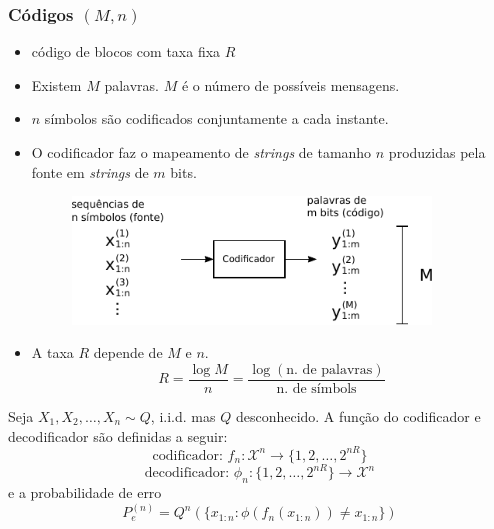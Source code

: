 \begin{frame}[allowframebreaks]
  \frametitle{Códigos $(M,n)$}
  \begin{itemize}
  \item código de blocos com taxa fixa $R$
  \item Existem $M$ palavras. $M$ é o número de possíveis mensagens.
  \item $n$ símbolos são codificados conjuntamente a cada instante.
  \item O codificador faz o mapeamento de \textit{strings} de tamanho $n$ produzidas pela fonte em \textit{strings} de $m$ bits.
    \begin{figure}[h!]
    \centering
    \includegraphics[width=0.9\textwidth]{images/Mncodes2.pdf}
    \label{fig:Mncodes}
    \end{figure}
  \item A taxa $R$ depende de $M$ e $n$.
	\begin{equation}
	R = \frac{\log M}{n} = \frac{\log (\text{n. de palavras}) }{\text{n. de símbols}}
	\end{equation}
  \end{itemize}

  \framebreak

  \begin{definition}
  Seja $X_1, X_2, \ldots, X_n \sim Q$, i.i.d. mas $Q$ desconhecido. A função do codificador
  e decodificador são definidas a seguir:
	\begin{equation}
	\text{codificador: } f_n : \mathcal{X}^n \rightarrow \{1,2,\ldots,2^{nR}\}
	\end{equation}
	\begin{equation}
        \text{decodificador: } \phi_n : \{1,2,\ldots,2^{nR}\} \rightarrow \mathcal{X}^n
	\end{equation}
  e a probabilidade de erro
	\begin{equation}
	P_e^{(n)} = Q^n (\{ x_{1:n} : \phi (f_n (x_{1:n})) \neq x_{1:n} \})
        \end{equation}	
  \end{definition}


\end{frame}

